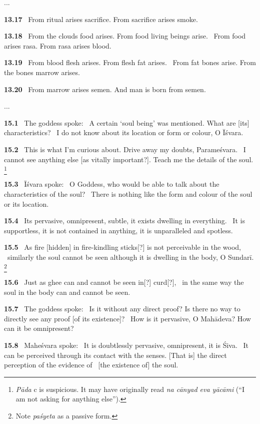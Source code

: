 \documentclass{article}
\newcommand{\skt}[1]{\textit{#1}}
\begin{document}
...


\textbf{13.17}%
\ From ritual arises sacrifice. From sacrifice arises smoke.%


\textbf{13.18}%
\ From the clouds food arises. From food living beings arise.%
\ From food arises rasa. From rasa arises blood.%


\textbf{13.19}%
\ From blood flesh arises. From flesh fat arises.%
\ From fat bones arise. From the bones marrow arises.%


\textbf{13.20}%
\ From marrow arises semen. And man is born from semen.%


...



\textbf{15.1}%
\ The goddess spoke:%
\ A certain `soul being' was mentioned. What are [its] characteristics?%
\                  I do not know about its location or form or colour, O Īśvara.%


\textbf{15.2}%
\ This is what I'm  curious about. Drive away my doubts, Parameśvara.%
\                  I cannot see anything else [as vitally important?]. Teach me the details of the soul.%
\footnote{\skt{Pāda} c is suspicious. It may have originally read \skt{na cānyad eva yācāmi} (``I am not asking for anything else''). }%


\textbf{15.3}%
\ Īśvara spoke:%
\ O Goddess, who would be able to talk about the characteristics of the soul?%
\                  There is nothing like the form and colour of the soul or its location.%


\textbf{15.4}%
\ Its pervasive, omnipresent, subtle, it exists dwelling in everything.%
\                  It is supportless, it is not contained in anything, it is unparalleled and spotless.%


\textbf{15.5}%
\ As fire [hidden] in fire-kindling sticks[?] is not perceivable in the wood,%
\                 similarly the soul cannot be seen although it is dwelling in the body, O Sundarī.%
\footnote{Note \skt{paśyeta} as a passive form. }%


\textbf{15.6}%
\ Just as ghee can and cannot be seen in[?] curd[?],%
\                  in the same way the soul in the body can and cannot be seen.%


\textbf{15.7}%
\ The goddess spoke:%
\ Is it without any direct proof? Is there no way to directly see any proof [of its existence]?%
\                  How is it pervasive, O Mahādeva? How can it be omnipresent?%


\textbf{15.8}%
\ Maheśvara spoke:%
\ It is doubtlessly pervasive, omnipresent, it is Śiva.%
\                   It can be perceived through its contact with the senses. [That is] the direct perception of the evidence of%
\                         [the existence of] the soul.%
\end{document}
